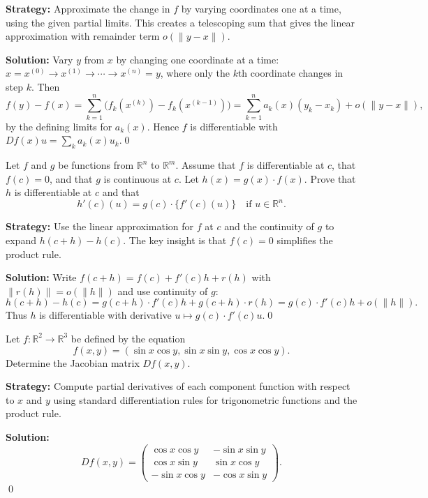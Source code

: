 \noindent\textbf{Strategy:} Approximate the change in \( f \) by varying coordinates one at a time, using the given partial limits. This creates a telescoping sum that gives the linear approximation with remainder term \( o(\|y-x\|) \).

\bigskip\noindent\textbf{Solution:}
Vary $y$ from $x$ by changing one coordinate at a time: $x=x^{(0)}\to x^{(1)}\to\cdots\to x^{(n)}=y$, where only the $k$th coordinate changes in step $k$. Then
\[f(y)-f(x)=\sum_{k=1}^n\big(f_k(x^{(k)})-f_k(x^{(k-1)})\big)=\sum_{k=1}^n a_k(x)(y_k-x_k)+o(\|y-x\|),\]
by the defining limits for $a_k(x)$. Hence $f$ is differentiable with $Df(x)u=\sum_k a_k(x)u_k$.\qed


\begin{problembox}
Let \( f \) and \( g \) be functions from \( \mathbb{R}^n \) to \( \mathbb{R}^m \). Assume that \( f \) is differentiable at \( c \), that \( f(c) = 0 \), and that \( g \) is continuous at \( c \). Let \( h(x) = g(x) \cdot f(x) \). Prove that \( h \) is differentiable at \( c \) and that
\[h'(c)(u) = g(c) \cdot \{f'(c)(u)\} \quad \text{if } u \in \mathbb{R}^n.\]
\end{problembox}

\noindent\textbf{Strategy:} Use the linear approximation for \( f \) at \( c \) and the continuity of \( g \) to expand \( h(c+h) - h(c) \). The key insight is that \( f(c) = 0 \) simplifies the product rule.

\bigskip\noindent\textbf{Solution:}
Write $f(c+h)=f(c)+f'(c)h+r(h)$ with $\|r(h)\|=o(\|h\|)$ and use continuity of $g$:
\[h(c+h)-h(c)=g(c+h)\cdot f'(c)h+g(c+h)\cdot r(h)=g(c)\cdot f'(c)h+o(\|h\|).\]
Thus $h$ is differentiable with derivative $u\mapsto g(c)\cdot f'(c)u$.\qed


\begin{problembox}
Let \( f : \mathbb{R}^2 \to \mathbb{R}^3 \) be defined by the equation
\[f(x, y) = (\sin x \cos y, \sin x \sin y, \cos x \cos y).\]
Determine the Jacobian matrix \( Df(x, y) \).
\end{problembox}

\noindent\textbf{Strategy:} Compute partial derivatives of each component function with respect to \( x \) and \( y \) using standard differentiation rules for trigonometric functions and the product rule.

\bigskip\noindent\textbf{Solution:}
\[Df(x,y)=\begin{pmatrix}
\cos x\cos y & -\sin x\sin y\\
\cos x\sin y & \sin x\cos y\\
-\sin x\cos y & -\cos x\sin y
\end{pmatrix}.\]\qed


